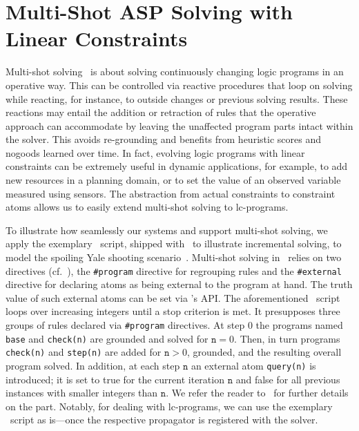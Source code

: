 \section{Multi-Shot ASP Solving with Linear Constraints}
\label{sec:multishot}
Multi-shot solving~\cite{gekakasc14b} is about solving continuously changing logic programs in an operative way.
This can be controlled via reactive procedures that loop on solving while reacting, for instance, to outside changes or previous solving results.
These reactions may entail the addition or retraction of rules that the operative approach can accommodate by leaving the unaffected program parts
intact within the solver.
This avoids re-grounding and benefits from heuristic scores and nogoods learned over time.
%
In fact, 
evolving logic programs with linear constraints can be extremely useful in dynamic applications, for example, to %
add new resources in a planning domain,
or to set the value of an observed variable measured using sensors.
The abstraction from actual constraints to constraint atoms
allows us to easily extend multi-shot solving to lc-programs.

To illustrate how seamlessly our systems  and  support multi-shot solving,
we apply the exemplary \python\ script, shipped with \clingo\ to illustrate incremental solving,
to model the spoiling Yale shooting scenario~\cite{caotpo00a}.
%
Multi-shot solving in \clingo\ relies on two directives (cf.~\cite{gekakasc14b}),
the \texttt{\#program} directive for regrouping rules
and
the \texttt{\#external} directive for declaring atoms
as being external to the program at hand.
The truth value of such external atoms can be set via \clingo's API\@.
The aforementioned \python\ script loops over increasing integers until a stop criterion is met.
It presupposes three groups of rules declared via \texttt{\#program} directives.
At step 0 the programs named \texttt{base} and \texttt{check(n)} are grounded and solved for $\texttt{n}=0$.
Then, in turn programs \texttt{check(n)} and \texttt{step(n)} are added for $\texttt{n}>0$, grounded, and the resulting overall program solved.
In addition, at each step $\texttt{n}$ an external atom \texttt{query(n)} is introduced;
it is set to true for the current iteration $\texttt{n}$ and false for all previous instances with smaller integers than $\texttt{n}$.
We refer the reader to~\cite{gekakasc14b} for further details on the \python{} part.
Notably, for dealing with lc-programs,
we can use the exemplary \python\ script as is---once the respective propagator is registered with the solver.

